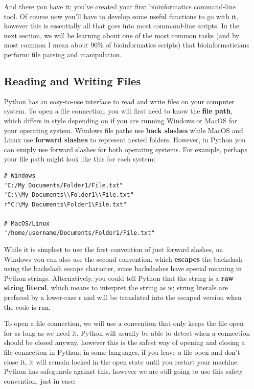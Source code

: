 \documentclass[a4paper,11pt]{article}
\begin{document}
And there you have it; you've created your first bioinformatics command-line tool.  Of 
course now you'll have to develop some useful functions to go with it, however this is 
essentially all that goes into most command-line scripts.  In the next section, we will 
be learning about one of the most common tasks (and by most common I mean about 90\% of 
bioinformatics scripts) that bioinformaticians perform: file parsing and manipulation.

\pagebreak
\subsection{Reading and Writing Files}
Python has an easy-to-use interface to read and write files on your computer system.  To 
open a file connection, you will first need to know the \textbf{file path}, which differs 
in style depending on if you are running Windows or MacOS for your operating system.  
Windows file paths use \textbf{back slashes} while MacOS and Linux use \textbf{forward slashes} 
to represent nested folders.  However, in Python you can simply use forward slashes for both 
operating systems.
For example, perhaps your file path might look like this for 
each system:

\vspace{3mm}
\begin{lstlisting}
# Windows
"C:/My Documents/Folder1/File.txt"
"C:\\My Documents\\Folder1\\File.txt"
r"C:\My Documents\Folder1\File.txt"

# MacOS/Linux
"/home/username/Documents/Folder1/File.txt"
\end{lstlisting}
\vspace{3mm}

While it is simplest to use the first convention of just forward slashes, on Windows you can also 
use the second convention, which \textbf{escapes} the backslash using the backslash escape character, 
since backslashes have special meaning in Python strings.  Alternatively, you could tell Python that 
the string is a \textbf{raw string literal}, which means to interpret the string as is; string literals 
are prefaced by a lower-case r and will be translated into the escaped version when the code is run.  \par

To open a file connection, we will use a convention that only keeps the file open for as long as we need 
it.  Python will usually be able to detect when a connection should be closed anyway, however this is 
the safest way of opening and closing a file connection in Python; in some languages, if you leave a 
file open and don't close it, it will remain locked in the open state until you restart your machine.  
Python has safeguards against this, however we are still going to use this safety convention, just in case:
\end{document}
